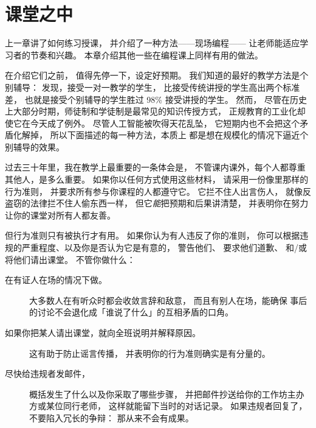 \chapter{课堂之中}\label{s:classroom}

上一章讲了如何练习授课，
并介绍了一种方法——现场编程——
让老师能适应学习者的节奏和兴趣。
本章介绍其他一些在编程课上同样有用的做法。

在介绍它们之前，
值得先停一下，设定好预期。
我们知道的最好的教学方法是个别辅导：
\cite{Bloo1984}发现，接受一对一教学的学生，
比接受传统讲授的学生高出两个标准差，
也就是接受个别辅导的学生胜过
98\% 接受讲授的学生。
然而，
尽管在历史上大部分时期，师徒制和学徒制是最常见的知识传授方式，
正规教育的工业化却使它在今天成了例外。
尽管人工智能被吹得天花乱坠，
它短期内也不会把这个矛盾化解掉，
所以下面描述的每一种方法，本质上
都是想在规模化的情况下逼近个别辅导的效果。


过去三十年里，我在教学上最重要的一条体会是，
不管课内课外，每个人都尊重其他人，是多么重要。
如果你以任何方式使用这些材料，
请采用一份像里那样的行为准则，
并要求所有参与你课程的人都遵守它。
它拦不住人出言伤人，
就像反盗窃的法律拦不住人偷东西一样，
但它\emph{能}把预期和后果讲清楚，
并表明你在努力让你的课堂对所有人都友善。

但行为准则只有被执行才有用。
如果你认为有人违反了你的准则，
你可以根据违规的严重程度、以及你是否认为它是有意的，
警告他们、
要求他们道歉、
和/或将他们请出课堂。
不管你做什么：

\begin{description}

\item[在有证人在场的情况下做。]
  大多数人在有听众时都会收敛言辞和敌意，
  而且有别人在场，能确保
  事后的讨论不会退化成「谁说了什么」的互相矛盾的口角。

\item[如果你把某人请出课堂，就向全班说明并解释原因。]
  这有助于防止谣言传播，
  并表明你的行为准则确实是有分量的。

\item[尽快给违规者发邮件，]
  概括发生了什么以及你采取了哪些步骤，
  并把邮件抄送给你的工作坊主办方或某位同行老师，
  这样就能留下当时的对话记录。
  如果违规者回复了，
  不要陷入冗长的争辩：
  那从来不会有成果。

\end{description}

